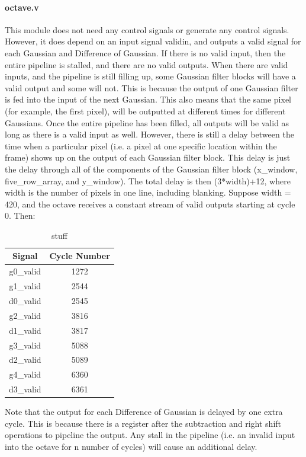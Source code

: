 \paragraph{octave.v}
This module does not need any control signals or generate any control signals. 
However, it does depend on an input signal validin, and outputs a valid signal 
for each Gaussian and Difference of Gaussian. If there is no valid input, then 
the entire pipeline is stalled, and there are no valid outputs. When there are 
valid inputs, and the pipeline is still filling up, some Gaussian filter blocks 
will have a valid output and some will not. This is because the output of one 
Gaussian filter is fed into the input of the next Gaussian. This also means that 
the same pixel (for example, the first pixel), will be outputted at different 
times for different Gaussians. Once the entire pipeline has been filled, all 
outputs will be valid as long as there is a valid input as well. However, there 
is still a delay between the time when a particular pixel (i.e. a pixel at one 
specific location within the frame) shows up on the output of each Gaussian 
filter block. This delay is just the delay through all of the components of the 
Gaussian filter block (x\_window, five\_row\_array, and y\_window). The total delay 
is then (3*width)+12, where width is the number of pixels in one line, including 
blanking. Suppose width = 420, and the octave receives a constant stream of 
valid outputs starting at cycle 0. Then:

\begin{table}
\begin{tabular}{c | c} \toprule
 Signal & Cycle Number \\\toprule
 g0\_valid & 1272 \\
 g1\_valid & 2544 \\
 d0\_valid & 2545 \\
 g2\_valid & 3816 \\
 d1\_valid & 3817 \\
 g3\_valid & 5088 \\
 d2\_valid & 5089 \\
 g4\_valid & 6360 \\
 d3\_valid & 6361 \\
\end{tabular}
\caption{ stuff }\label{wrap-tab:valids}
\end{table}

Note that the output for each Difference of Gaussian is delayed by one extra cycle. This is because there is a register after the subtraction and right shift operations to pipeline the output. Any stall in the pipeline (i.e. an invalid input into the octave for n number of cycles) will cause an additional delay.

